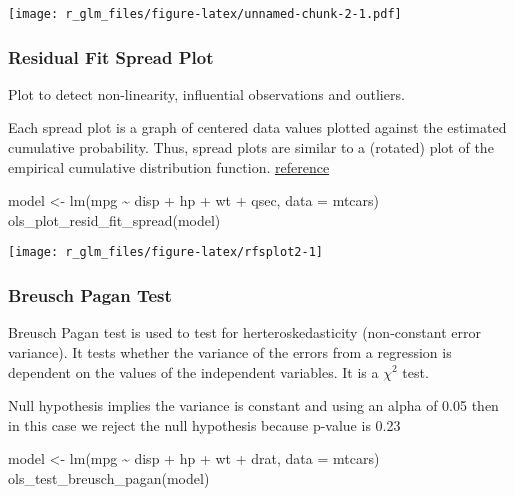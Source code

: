 \documentclass[
]{article}
\newenvironment{Shaded}{\begin{snugshade}}{\end{snugshade}}
\newcommand{\AttributeTok}[1]{\textcolor[rgb]{0.77,0.63,0.00}{#1}}
\newcommand{\FunctionTok}[1]{\textcolor[rgb]{0.00,0.00,0.00}{#1}}
\newcommand{\NormalTok}[1]{#1}
\newcommand{\OtherTok}[1]{\textcolor[rgb]{0.56,0.35,0.01}{#1}}
\newcommand{\SpecialCharTok}[1]{\textcolor[rgb]{0.00,0.00,0.00}{#1}}
\begin{document}
\texttt{[image: r\_glm\_files/figure-latex/unnamed-chunk-2-1.pdf]}

\hypertarget{residual-fit-spread-plot}{%
\subsubsection{Residual Fit Spread
Plot}\label{residual-fit-spread-plot}}

Plot to detect non-linearity, influential observations and outliers.

Each spread plot is a graph of centered data values plotted against the
estimated cumulative probability. Thus, spread plots are similar to a
(rotated) plot of the empirical cumulative distribution function.
\href{https://blogs.sas.com/content/iml/2013/06/12/interpret-residual-fit-spread-plot.html}{reference}

\begin{Shaded}
\begin{Highlighting}[]
\NormalTok{model }\OtherTok{\textless{}{-}} \FunctionTok{lm}\NormalTok{(mpg }\SpecialCharTok{\textasciitilde{}}\NormalTok{ disp }\SpecialCharTok{+}\NormalTok{ hp }\SpecialCharTok{+}\NormalTok{ wt }\SpecialCharTok{+}\NormalTok{ qsec, }\AttributeTok{data =}\NormalTok{ mtcars)}
\FunctionTok{ols\_plot\_resid\_fit\_spread}\NormalTok{(model)}
\end{Highlighting}
\end{Shaded}

\begin{center}\texttt{[image: r\_glm\_files/figure-latex/rfsplot2-1]} \end{center}

\hypertarget{breusch-pagan-test}{%
\subsubsection{Breusch Pagan Test}\label{breusch-pagan-test}}

Breusch Pagan test is used to test for herteroskedasticity (non-constant
error variance). It tests whether the variance of the errors from a
regression is dependent on the values of the independent variables. It
is a \(\chi^{2}\) test.

Null hypothesis implies the variance is constant and using an alpha of
0.05 then in this case we reject the null hypothesis because p-value is
0.23

\begin{Shaded}
\begin{Highlighting}[]
\NormalTok{model }\OtherTok{\textless{}{-}} \FunctionTok{lm}\NormalTok{(mpg }\SpecialCharTok{\textasciitilde{}}\NormalTok{ disp }\SpecialCharTok{+}\NormalTok{ hp }\SpecialCharTok{+}\NormalTok{ wt }\SpecialCharTok{+}\NormalTok{ drat, }\AttributeTok{data =}\NormalTok{ mtcars)}
\FunctionTok{ols\_test\_breusch\_pagan}\NormalTok{(model)}
\end{Highlighting}
\end{Shaded}
\end{document}
